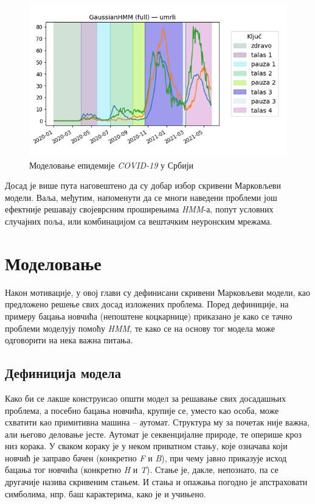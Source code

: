 \documentclass[12pt,oneside]{memoir}
\begin{document}
\begin{CJK}{UTF8}{ipxm}
\begin{figure}[H]
  \centering
  \includegraphics[width=.8\textwidth]{covid.png}
  \caption{Моделовање епидемије \textit{COVID-19} у Србији\cite{vasovic2021}}
  \label{fig:covid}
\end{figure}

Досад је више пута наговештено да су добар избор скривени Марковљеви модели. Ваља, међутим, напоменути да се многи наведени проблеми још ефектније решавају својеврсним проширењима \textit{HMM}-а, попут условних случајних поља\cite{ponomareva2007}, или комбинацијом са вештачким неуронским мрежама\cite{cohen1999}.

\chapter{Моделовање}
Након мотивације, у овој глави су дефинисани скривени Марковљеви модели, као предложено решење свих досад изложених проблема. Поред дефиниције, на примеру бацања новчића (непоштене коцкарнице) приказано је како се тачно проблеми моделују помоћу \textit{HMM}, те како се на основу тог модела може одговорити на нека важна питања.

\section{Дефиниција модела}
Како би се лакше конструисао општи модел за решавање свих досадашњих проблема, а посебно бацања новчића, крупије се, уместо као особа, може схватити као примитивна машина -- аутомат. Структура му за почетак није важна, али његово деловање јесте. Аутомат је секвенцијалне природе, те оперише кроз низ корака. У сваком кораку је у неком приватном стању, које означава који новчић је заправо бачен (конкретно \textit{F} и \textit{B}), при чему јавно приказује исход бацања тог новчића (конкретно \textit{H} и \textit{T}). Стање је, дакле, непознато, па се другачије назива скривеним стањем. И стања и опажања погодно је апстраховати симболима, нпр. баш карактерима, како је и учињено.


\end{CJK}
\end{document}
